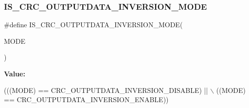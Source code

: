 \subsubsection{\texorpdfstring{I\+S\+\_\+\+C\+R\+C\+\_\+\+O\+U\+T\+P\+U\+T\+D\+A\+T\+A\+\_\+\+I\+N\+V\+E\+R\+S\+I\+O\+N\+\_\+\+M\+O\+DE}{IS\_CRC\_OUTPUTDATA\_INVERSION\_MODE}}
{\footnotesize\ttfamily \#define I\+S\+\_\+\+C\+R\+C\+\_\+\+O\+U\+T\+P\+U\+T\+D\+A\+T\+A\+\_\+\+I\+N\+V\+E\+R\+S\+I\+O\+N\+\_\+\+M\+O\+DE(\begin{DoxyParamCaption}\item[{}]{M\+O\+DE }\end{DoxyParamCaption})}

{\bfseries Value\+:}
\begin{DoxyCode}
(((MODE) == CRC\_OUTPUTDATA\_INVERSION\_DISABLE) || \(\backslash\)
                                                   ((MODE) == CRC\_OUTPUTDATA\_INVERSION\_ENABLE))
\end{DoxyCode}
